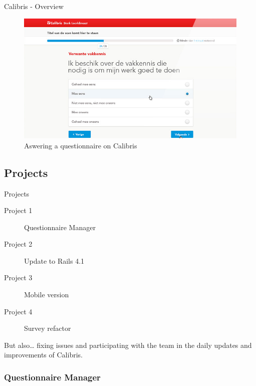 \documentclass[10pt,a4paper]{beamer}
\begin{document}
\begin{frame}{Calibris - Overview}
  \begin{figure}[htp]
  \centering
  \includegraphics[scale=0.4]{../img/calibris2.png}
   \caption{Aswering a questionnaire on Calibris}
   \label{fig.calibris2}
  \end{figure}
\end{frame}

\subsection{Projects}

\begin{frame}{Projects}
  \begin{description}
    \item[Project 1] Questionnaire Manager
    \item[Project 2] Update to Rails 4.1
    \item[Project 3] Mobile version
    \item[Project 4] Survey refactor
  \end{description}
  But also… fixing issues and participating with the team in the daily updates and improvements of Calibris.
\end{frame}

\subsubsection{Questionnaire Manager}
\end{document}
